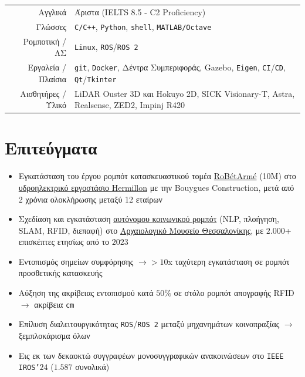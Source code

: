 \documentclass[a4paper,10pt,twoside]{article}
\begin{document}
\begin{center}
\begin{tabular}{rl}
Αγγλικά & Άριστα (IELTS 8.5 - C2 Proficiency) \\
Γλώσσες & \texttt{C/C++}, \texttt{Python}, \texttt{shell}, \texttt{MATLAB/Octave} \\
Ρομποτική / ΛΣ & \texttt{Linux},  \texttt{ROS}/\texttt{ROS 2} \\
Εργαλεία / Πλαίσια & \texttt{git}, \texttt{Docker}, Δέντρα Συμπεριφοράς, Gazebo, \texttt{Eigen}, \texttt{CI}/\texttt{CD}, \texttt{Qt}/\texttt{Tkinter} \\
Αισθητήρες / Υλικό & {\small LiDAR Ouster 3D και Hokuyo 2D, SICK Visionary-T, Astra, Realsense, ZED2, Impinj R420 }%
\end{tabular}
\end{center}
\verticalspacebetweensections

\section{\textbf{Επιτεύγματα}}\verticalspacebetweensectionandcontent
  \noindent\begin{minipage}[t]{\textwidth}
    \begin{itemize}
      \item Εγκατάσταση του έργου ρομπότ κατασκευαστικού τομέα \href{https://www.robetarme-project.eu/sobre/}{RoBétArmé} (\texteuro10M) στο \href{https://www.gem.wiki/Hermillon_hydroelectric_plant}{υδροηλεκτρικό εργοστάσιο Hermillon} με την Bouygues Construction, μετά από 2 χρόνια ολοκλήρωσης μεταξύ 12 εταίρων\verticalspaceafteritem
      \item Σχεδίαση και εγκατάσταση \href{https://www.youtube.com/watch?v=2EvTGNOqTrs}{αυτόνομου κοινωνικού ρομπότ} (NLP, πλοήγηση, SLAM, RFID, διεπαφή) στο \href{https://www.amth.gr/}{Αρχαιολογικό Μουσείο Θεσσαλονίκης}, με $2$$.$$000$+ επισκέπτες ετησίως από το $2023$\verticalspaceafteritem
      \item Εντοπισμός σημείων συμφόρησης $\rightarrow > 10$x ταχύτερη εγκατάσταση σε ρομπότ προσθετικής κατασκευής\verticalspaceafteritem
      \item Αύξηση της ακρίβειας εντοπισμού κατά $50\%$ σε στόλο ρομπότ απογραφής RFID $\rightarrow$ ακρίβεια \texttt{cm}\verticalspaceafteritem
      \item Επίλυση διαλειτουργικότητας \texttt{ROS}/\texttt{ROS~2} μεταξύ μηχανημάτων κοινοπραξίας $\rightarrow$ ξεμπλοκάρισμα όλων\verticalspaceafteritem
      \item Εις εκ των δεκαοκτώ συγγραφέων μονοσυγγραφικών ανακοινώσεων στο \texttt{IEEE IROS'}$24$ ($1$$.$$587$ συνολικά)
    \end{itemize}
  \end{minipage} \\%
\verticalspacebetweensections
\end{document}
